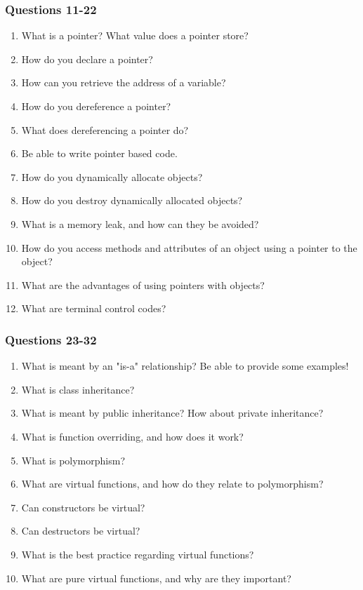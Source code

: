 \documentclass{beamer}
\newcounter{question}
\begin{document}
\begin{frame}
    \frametitle{Questions 11-22}
    \begin{enumerate}[<+->]
        \setcounter{enumi}{\value{question}}
        \item What is a pointer?  What value does a pointer store?
        \item How do you declare a pointer?
        \item How can you retrieve the address of a variable?
        \item How do you dereference a pointer? 
        \item What does dereferencing a pointer do?
        \item Be able to write pointer based code.
        \item How do you dynamically allocate objects?
        \item How do you destroy dynamically allocated objects?
        \item What is a memory leak, and how can they be avoided?
        \item How do you access methods and attributes of an object using a pointer to the object?
        \item What are the advantages of using pointers with objects?
        \item What are terminal control codes?
        \setcounter{question}{\value{enumi}}
    \end{enumerate}
\end{frame}

\begin{frame}
    \frametitle{Questions 23-32}
    \begin{enumerate}[<+->]
        \setcounter{enumi}{\value{question}}
        \item What is meant by an "is-a" relationship?  Be able to provide some examples!
        \item What is class inheritance?
        \item What is meant by public inheritance?  How about private inheritance?
        \item What is function overriding, and how does it work?
        \item What is polymorphism?
        \item What are virtual functions, and how do they relate to polymorphism?
        \item Can constructors be virtual?
        \item Can destructors be virtual?
        \item What is the best practice regarding virtual functions?
        \item What are pure virtual functions, and why are they important?
        \setcounter{question}{\value{enumi}}
    \end{enumerate}
\end{frame}
\end{document}
